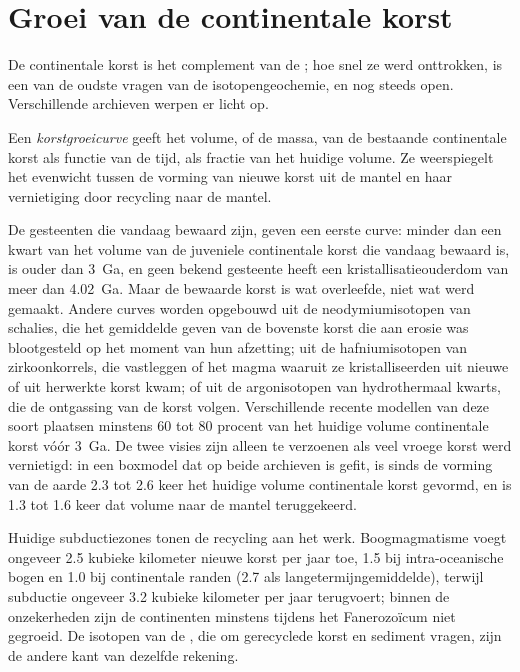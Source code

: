 \section{Groei van de continentale korst}

De continentale korst is het complement van de ; hoe snel ze werd
onttrokken, is een van de oudste vragen van de isotopengeochemie, en nog steeds
open. Verschillende archieven werpen er licht op.

\begin{definition}[Korstgroeicurve]\label{def:b2:isotope-geochemistry:growth}
Een \emph{korstgroeicurve} geeft het volume, of de
massa, van de bestaande continentale korst als functie van de tijd, als fractie van
het huidige volume. Ze weerspiegelt het evenwicht tussen de vorming van nieuwe korst
uit de mantel en haar vernietiging door recycling naar de mantel.
\end{definition}

De gesteenten die vandaag bewaard zijn, geven een eerste curve: minder dan een kwart van het volume
van de juveniele continentale korst die vandaag bewaard is, is ouder dan \qty{3}{Ga}, en
geen bekend gesteente heeft een kristallisatieouderdom van meer dan \qty{4.02}{Ga}. Maar de
bewaarde korst is wat overleefde, niet wat werd gemaakt. Andere curves worden opgebouwd uit
de neodymiumisotopen van schalies, die het gemiddelde geven van de bovenste korst die aan
erosie was blootgesteld op het moment van hun afzetting; uit de hafniumisotopen van
zirkoonkorrels, die vastleggen of het magma waaruit ze kristalliseerden uit nieuwe of uit
herwerkte korst kwam; of uit de argonisotopen van hydrothermaal kwarts, die de
ontgassing van de korst volgen. Verschillende recente modellen van deze soort plaatsen minstens 60
tot 80 procent van het huidige volume continentale korst vóór
\qty{3}{Ga}. De twee visies zijn alleen te verzoenen als veel vroege korst
werd vernietigd: in een boxmodel dat op beide archieven is gefit, is sinds de vorming van de aarde 2.3 tot 2.6 keer het
huidige volume continentale korst gevormd,
en is 1.3 tot 1.6 keer dat volume naar de mantel teruggekeerd.

Huidige subductiezones tonen de recycling aan het werk. Boogmagmatisme voegt
ongeveer 2.5 kubieke kilometer nieuwe korst per jaar toe, 1.5 bij intra-oceanische bogen en
1.0 bij continentale randen (2.7 als langetermijngemiddelde), terwijl subductie
ongeveer 3.2 kubieke kilometer per jaar terugvoert; binnen de onzekerheden zijn de
continenten minstens tijdens het Fanerozoïcum niet gegroeid. De isotopen van de
, die om gerecyclede korst en sediment vragen, zijn de andere kant van
dezelfde rekening.

